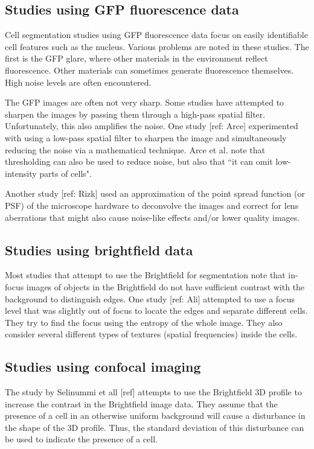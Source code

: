 \subsection{Studies using GFP fluorescence data}

Cell segmentation studies using GFP fluorescence data focus on easily identifiable cell features such as the nucleus. Various problems are noted in these studies. The first is the GFP glare, where other materials in the environment reflect fluorescence. Other materials can sometimes generate fluorescence themselves. High noise levels are often encountered.

The GFP images are often not very sharp. Some studies have attempted to sharpen the images by passing them through a high-pass spatial filter. Unfortunately, this also amplifies the noise. One study [ref: Arce] experimented with using a low-pass spatial filter to sharpen the image and simultaneously reducing the noise via a mathematical technique. Arce et al. note that thresholding can also be used to reduce noise, but also that ``it can omit low-intensity parts of cells".

Another study [ref: Rizk] used an approximation of the point spread function (or PSF) of the microscope hardware to deconvolve the images and correct for lens aberrations that might also cause noise-like effects and/or lower quality images.

\subsection{Studies using brightfield data}

Most studies that attempt to use the Brightfield for segmentation note that in-focus images of objects in the Brightfield do not have sufficient contrast with the background to distinguish edges. One study [ref: Ali] attempted to use a focus level that was slightly out of focus to locate the edges and separate different cells. They try to find the focus using the entropy of the whole image. They also consider several different types of textures (spatial frequencies) inside the cells.

\subsection{Studies using confocal imaging}

The study by Selinummi et all [ref] attempts to use the Brightfield 3D profile to increase the contrast in the Brightfield image data. They assume that the presence of a cell in an otherwise uniform background will cause a disturbance in the shape of the 3D profile. Thus, the standard deviation of this disturbance can be used to indicate the presence of a cell.

